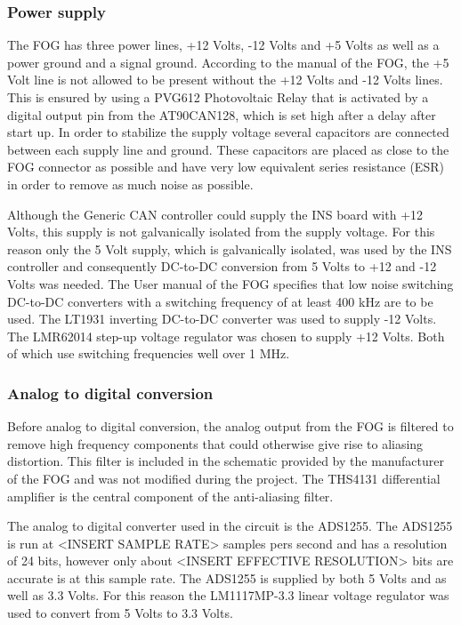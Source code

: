 \subsubsection{Power supply}
The FOG has three power lines, +12 Volts, -12 Volts and +5 Volts as well as a power ground and a signal ground. \newline
According to the manual of the FOG, the +5 Volt line is not allowed to be present without the +12 Volts and -12 Volts lines. This is ensured by using a PVG612 Photovoltaic Relay that is activated by a digital output pin from the AT90CAN128, which is set high after a delay after start up. \newline
In order to stabilize the supply voltage several capacitors are connected between each supply line and ground. These capacitors are placed as close to the FOG connector as possible and have very low equivalent series resistance (ESR) in order to remove as much noise as possible. 

Although the Generic CAN controller could supply the INS board with +12 Volts, this supply is not galvanically isolated from the supply voltage. For this reason only the 5 Volt supply, which is galvanically isolated, was used by the INS controller and consequently DC-to-DC conversion from 5 Volts to +12 and -12 Volts was needed. \newline
The User manual of the FOG specifies that low noise switching DC-to-DC converters with a switching frequency of at least 400 kHz are to be used. The LT1931 inverting DC-to-DC converter was used to supply -12 Volts. The LMR62014 step-up voltage regulator was chosen to supply +12 Volts. Both of which use switching frequencies well over 1 MHz.


\subsubsection{Analog to digital conversion}
Before analog to digital conversion, the analog output from the FOG is filtered to remove high frequency components that could otherwise give rise to aliasing distortion. This filter is included in the schematic provided by the manufacturer of the FOG and was not modified during the project. \newline
The THS4131 differential amplifier is the central component of the anti-aliasing filter. 

The analog to digital converter used in the circuit is the ADS1255. The ADS1255 is run at <INSERT SAMPLE RATE> samples pers second and has a resolution of 24 bits, however only about <INSERT EFFECTIVE RESOLUTION> bits are accurate is at this sample rate. \newline
The ADS1255 is supplied by both 5 Volts and as well as 3.3 Volts. For this reason the LM1117MP-3.3 linear voltage regulator was used to convert from 5 Volts to 3.3 Volts. 


